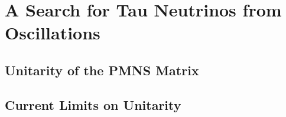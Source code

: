 \chapter{A Search for Tau Neutrinos from Oscillations}

\label{sec:unitarity}
\section{Unitarity of the PMNS Matrix}

\label{sec:current_limits}
\section{Current Limits on Unitarity}

\label{sec:mc_expectation}


\label{sec:tau_parametrization}


\label{sec:systematics}


\label{sec:likelihood}


\label{sec:sensitivity}


\label{sec:data_fits}
